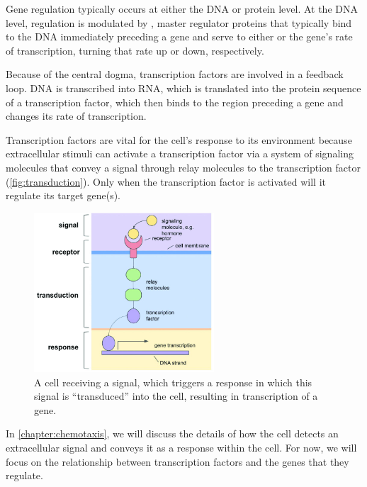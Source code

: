 Gene regulation typically occurs at either the DNA or protein level. At the DNA level, regulation is modulated by , master regulator proteins that typically bind to the DNA immediately preceding a gene and serve to either  or  the gene's rate of transcription, turning that rate up or down, respectively.

Because of the central dogma, transcription factors are involved in a feedback loop. DNA is transcribed into RNA, which is translated into the protein sequence of a transcription factor, which then binds to the region preceding a gene and changes its rate of transcription.

Transcription factors are vital for the cell's response to its environment because extracellular stimuli can activate a transcription factor via a system of signaling molecules that convey a signal through relay molecules to the transcription factor (\autoref{fig:transduction}). Only when the transcription factor is activated will it regulate its target gene(s).\\

\begin{figure}[h]
\centering
\mySfFamily
\includegraphics[width = 0.6\textwidth]{../images_CMYK/signal_pathway}
\caption{A cell receiving a signal, which triggers a response in which this signal is ``transduced'' into the cell, resulting in transcription of a gene.}
\label{fig:transduction}
\end{figure}

In \autoref{chapter:chemotaxis}, we will discuss the details of how the cell detects an extracellular signal and conveys it as a response within the cell. For now, we will focus on the relationship between transcription factors and the genes that they regulate.

